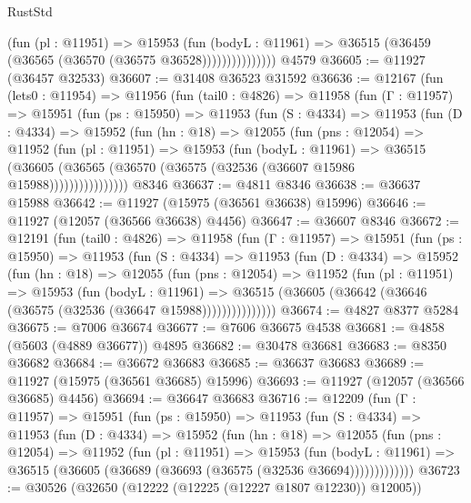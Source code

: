 \begin{lexlean}{RustStd}
\begin{coremodule}
                      (fun (pl : @11951) =>
                      @15953
                        (fun (bodyL : @11961) =>
                        @36515 (@36459 (@36565 (@36570 (@36575 @36528)))))))))))))))
    @4579
@36605 := @11927 (@36457 @32533)
@36607 := @31408 @36523 @31592
@36636 := @12167
    (fun (lets0 : @11954) =>
    @11956
      (fun (tail0 : @4826) =>
      @11958
        (fun (Γ : @11957) =>
        @15951
          (fun (ps : @15950) =>
          @11953
            (fun (S : @4334) =>
            @11953
              (fun (D : @4334) =>
              @15952
                (fun (hn : @18) =>
                @12055
                  (fun (pns : @12054) =>
                  @11952
                    (fun (pl : @11951) =>
                    @15953
                      (fun (bodyL : @11961) =>
                      @36515
                        (@36605
                          (@36565 (@36570 (@36575 (@32536 (@36607 @15986 @15988))))))))))))))))
    @8346
@36637 := @4811 @8346
@36638 := @36637 @15988
@36642 := @11927 (@15975 (@36561 @36638) @15996)
@36646 := @11927 (@12057 (@36566 @36638) @4456)
@36647 := @36607 @8346
@36672 := @12191
    (fun (tail0 : @4826) =>
    @11958
      (fun (Γ : @11957) =>
      @15951
        (fun (ps : @15950) =>
        @11953
          (fun (S : @4334) =>
          @11953
            (fun (D : @4334) =>
            @15952
              (fun (hn : @18) =>
              @12055
                (fun (pns : @12054) =>
                @11952
                  (fun (pl : @11951) =>
                  @15953
                    (fun (bodyL : @11961) =>
                    @36515 (@36605 (@36642 (@36646 (@36575 (@32536 (@36647 @15988)))))))))))))))
@36674 := @4827 @8377 @5284
@36675 := @7006 @36674
@36677 := @7606 @36675 @4538
@36681 := @4858 (@5603 (@4889 @36677)) @4895
@36682 := @30478 @36681
@36683 := @8350 @36682
@36684 := @36672 @36683
@36685 := @36637 @36683
@36689 := @11927 (@15975 (@36561 @36685) @15996)
@36693 := @11927 (@12057 (@36566 @36685) @4456)
@36694 := @36647 @36683
@36716 := @12209
    (fun (Γ : @11957) =>
    @15951
      (fun (ps : @15950) =>
      @11953
        (fun (S : @4334) =>
        @11953
          (fun (D : @4334) =>
          @15952
            (fun (hn : @18) =>
            @12055
              (fun (pns : @12054) =>
              @11952
                (fun (pl : @11951) =>
                @15953
                  (fun (bodyL : @11961) =>
                  @36515 (@36605 (@36689 (@36693 (@36575 (@32536 @36694)))))))))))))
@36723 := @30526 (@32650 (@12222 (@12225 (@12227 @1807 @12230)) @12005))

\end{coremodule}
\end{lexlean}
